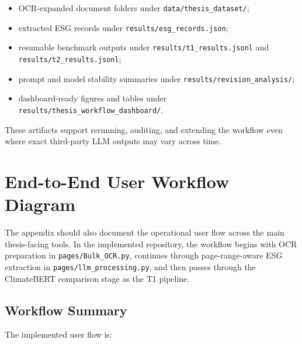 \documentclass[english, online, cse, master]{dithesis}
\providecommand{\tightlist}{\setlength{\itemsep}{0pt}\setlength{\parskip}{0pt}}
\begin{document}
\begin{itemize}
\def\labelenumi{\arabic{enumi}.}
\tightlist
\item
  OCR-expanded document folders under \texttt{data/thesis\_dataset/};
\item
  extracted ESG records under \texttt{results/esg\_records.json};
\item
  resumable benchmark outputs under \texttt{results/t1\_results.jsonl} and \texttt{results/t2\_results.jsonl};
\item
  prompt and model stability summaries under \texttt{results/revision\_analysis/};
\item
  dashboard-ready figures and tables under \texttt{results/thesis\_workflow\_dashboard/}.
\end{itemize}

These artifacts support rerunning, auditing, and extending the workflow even where exact third-party LLM outputs may vary across time.

\section{End-to-End User Workflow Diagram}\label{end-to-end-user-workflow-diagram}

The appendix should also document the operational user flow across the main thesis-facing tools. In the implemented repository, the workflow begins with OCR preparation in \texttt{pages/Bulk\_OCR.py}, continues through page-range-aware ESG extraction in \texttt{pages/llm\_processing.py}, and then passes through the ClimateBERT comparison stage as the T1 pipeline.

\subsection{Workflow Summary}\label{workflow-summary}

The implemented user flow is:
\end{document}

